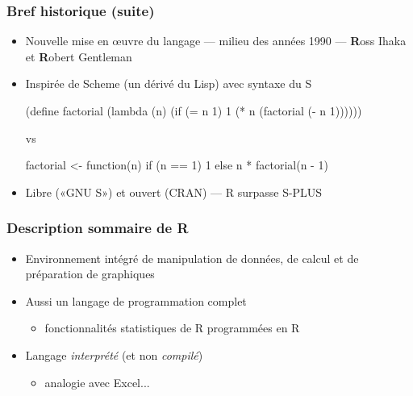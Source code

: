 \begin{frame}[fragile=singleslide]
  \frametitle{Bref historique (suite)}

  \begin{itemize}
  \item Nouvelle mise en {\oe}uvre du langage --- milieu des années
    1990 --- \textbf{R}oss Ihaka et \textbf{R}obert Gentleman
  \item Inspirée de Scheme (un dérivé du Lisp) avec syntaxe du S
\begin{Schunk}
\begin{Sinput}
(define factorial (lambda (n)
  (if (= n 1)
      1
    (* n (factorial (- n 1))))))
\end{Sinput}
\end{Schunk}
vs
\begin{Schunk}
\begin{Sinput}
factorial <- function(n)
  if (n == 1) 1 else n * factorial(n - 1)
\end{Sinput}
\end{Schunk}
  \item Libre («GNU S») et ouvert (CRAN) --- R surpasse S-PLUS
  \end{itemize}
\end{frame}

\begin{frame}
  \frametitle{Description sommaire de R}

  \begin{itemize}
  \item Environnement intégré de manipulation de données, de calcul et
    de préparation de graphiques
  \item Aussi un langage de programmation complet
    \begin{itemize}
    \item fonctionnalités statistiques de R programmées en R
    \end{itemize}
  \item Langage \emph{interprété} (et non \emph{compilé})
    \begin{itemize}
    \item analogie avec Excel...
    \end{itemize}
  \end{itemize}

  \begin{center}
    \setlength{\fboxrule}{0.5pt}%
    \href{https://youtu.be/PSQIKSKw_ys}{%
      }
  \end{center}
\end{frame}

